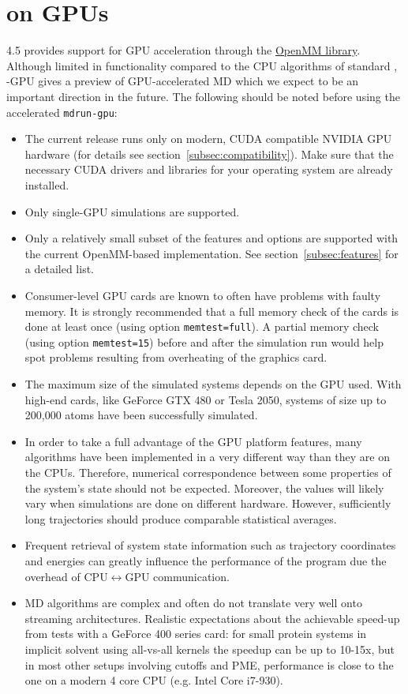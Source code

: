 \section{{\gromacs} on GPUs}

{\gromacs} 4.5 provides support for GPU acceleration through 
the \href{https://simtk.org/home/openmm}{OpenMM library}. 
Although limited in functionality compared to the CPU algorithms of standard {\gromacs},
{\gromacs}-GPU gives a preview of GPU-accelerated MD which we expect to be an important direction in the future. 
The following should be noted before using the accelerated {\tt mdrun-gpu}:
\begin{itemize}
\item The current release runs only on modern, CUDA compatible NVIDIA GPU hardware 
(for details see section~\ref{subsec:compatibility}). Make sure that the necessary CUDA drivers and 
libraries for your operating system are already installed. 
\item Only single-GPU simulations are supported.
\item Only a relatively small subset of the {\gromacs} features and options are supported 
with the  current OpenMM-based implementation. See section~\ref{subsec:features} for 
a detailed list.
\item Consumer-level GPU cards are known to often have problems with faulty memory.
It is strongly recommended that a full memory check of the cards is done at least once
(using option {\tt memtest=full}). A partial memory check (using option {\tt memtest=15}) 
before and after the simulation run would help spot problems resulting from overheating 
of the graphics card.
\item The maximum size of the simulated systems depends on the GPU used. With
high-end cards, like GeForce GTX 480 or Tesla 2050, systems of size up to 200,000 atoms 
have been successfully simulated.
\item In order to take a full advantage of the GPU platform features, many algorithms
have been implemented in a very different way than they are on the CPUs.
Therefore, numerical correspondence between some properties of the system's state
should not be expected. Moreover, the values will likely vary when simulations are
done on different hardware. However, sufficiently long trajectories
should produce comparable statistical averages.
\item Frequent retrieval of system state information such as
trajectory coordinates and energies can greatly influence the performance
of the program due the overhead of CPU$\leftrightarrow$GPU communication.
\item MD algorithms are complex and often do not translate very well onto streaming architectures.
Realistic expectations about the achievable speed-up from tests with a GeForce 400 series card:
for small protein systems in implicit solvent using all-vs-all kernels the speedup 
can be up to 10-15x, but in most other setups involving cutoffs and PME, 
performance is close to the one on a modern 4 core CPU (e.g. Intel Core i7-930).
\end{itemize}

